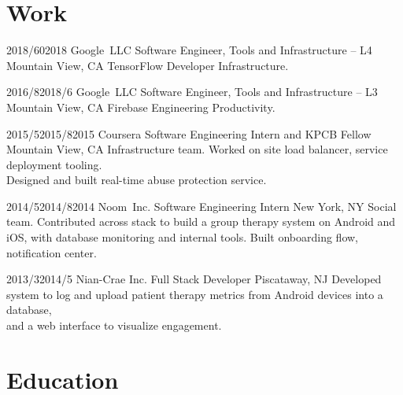 \documentclass[11pt,letterpaper]{moderncv}
\begin{document}
\maketitle

\section{Work}

    \tllabelcventry
        {2018/6}{0}{2018}
        {Google~LLC}
        {Software Engineer, Tools and Infrastructure -- L4}
        {Mountain View, CA}
        {}
        {TensorFlow Developer Infrastructure. \\}

    \tlcventry
        {2016/8}{2018/6}
        {Google~LLC}
        {Software Engineer, Tools and Infrastructure -- L3}
        {Mountain View, CA}
        {}
        {Firebase Engineering Productivity. \\}

    \tllabelcventry
        {2015/5}{2015/8}{2015}
        {Coursera}
        {Software Engineering Intern and KPCB Fellow}
        {Mountain View, CA}
        {}
        {Infrastructure team. Worked on site load balancer, service deployment tooling. \\Designed and built real-time abuse protection service. \\}

    \tllabelcventry
        {2014/5}{2014/8}{2014}
        {Noom~Inc.}
        {Software Engineering Intern}
        {New York, NY}
        {}
        {Social team. Contributed across stack to build a group therapy system on Android and iOS, with database monitoring and internal tools. Built onboarding flow, notification center.\\}

    \tlcventry
        {2013/3}{2014/5}
        {Nian-Crae Inc.}
        {Full Stack Developer}
        {Piscataway, NJ}
        {}
        {Developed system to log and upload patient therapy metrics from Android devices into a database,\\and a web interface to visualize engagement.\\}


\section{Education}
\end{document}
